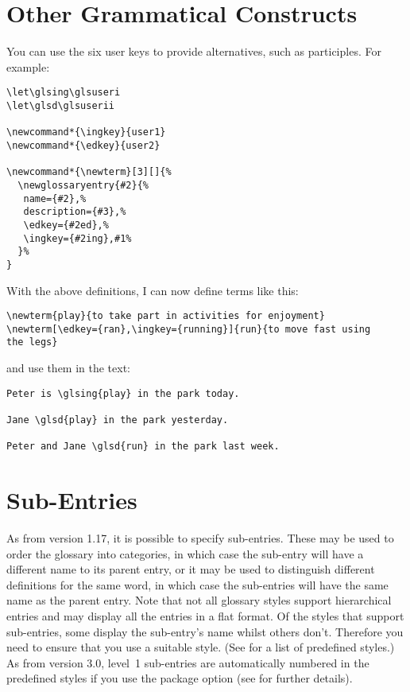 \documentclass[report]{nlctdoc}
\let\glsd\glsuseri
\begin{document}
\section{Other Grammatical Constructs}
\label{sec:grammar}

You can use the six user keys to provide alternatives, such as
participles. For example:
\begin{verbatim}
\let\glsing\glsuseri
\let\glsd\glsuserii

\newcommand*{\ingkey}{user1}
\newcommand*{\edkey}{user2}

\newcommand*{\newterm}[3][]{%
  \newglossaryentry{#2}{%
   name={#2},%
   description={#3},%
   \edkey={#2ed},%
   \ingkey={#2ing},#1%
  }%
}
\end{verbatim}
With the above definitions, I can now define terms like this:
\begin{verbatim}
\newterm{play}{to take part in activities for enjoyment}
\newterm[\edkey={ran},\ingkey={running}]{run}{to move fast using 
the legs}
\end{verbatim}
and use them in the text:
\begin{verbatim}
Peter is \glsing{play} in the park today.

Jane \glsd{play} in the park yesterday.

Peter and Jane \glsd{run} in the park last week.
\end{verbatim}

\section{Sub-Entries}
\label{sec:subentries}

As from version 1.17, it is possible to specify sub-entries. These
may be used to order the glossary into categories, in which case the
sub-entry will have a different name to its parent entry, or it may
be used to distinguish different definitions for the same word, in
which case the sub-entries will have the same name as the parent
entry. Note that not all glossary styles support hierarchical
entries and may display all the entries in a flat format. Of the
styles that support sub-entries, some display the sub-entry's name
whilst others don't. Therefore you need to ensure that you use a
suitable style. (See  for a list of predefined
styles.) As from version 3.0, level~1 sub-entries are automatically
numbered in the predefined styles if you use the
 package option (see
 for further details).
\end{document}
